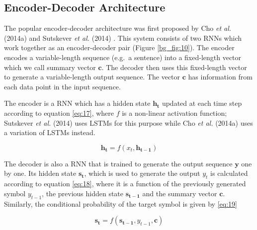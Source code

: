 \subsection{Encoder-Decoder Architecture} 
\label{bg:s4_sub1}

The popular encoder-decoder architecture was first proposed by Cho \textit{et al.} (2014a) \cite{cho2014learning} and Sutskever \textit{et al.} (2014) \cite{sutskever2014sequence}. This system consists of two \ac{RNN}s which work together as an encoder-decoder pair (Figure \ref{bg_fig:10}). The encoder encodes a variable-length sequence (e.g.\ a sentence) into a fixed-length vector which we call summary vector $ \mathbf{c} $. The decoder then uses this fixed-length vector to generate a variable-length output sequence. The vector $ \mathbf{c} $ has information from each data point in the input sequence.


The encoder is a \ac{RNN} which has a hidden state $\mathbf{h_t}$ updated at each time step according to equation \ref{eq:17}, where $f$ is a non-linear activation function;  Sutskever \textit{et al.} (2014) \cite{sutskever2014sequence} uses \ac{LSTM}s for this purpose while Cho \textit{et al.} (2014a) \cite{cho2014learning} uses a variation of \ac{LSTM}s instead.

\begin{equation}
\label{eq:17}
\mathbf{h_t} = f( x_t, \mathbf{h_{t-1}})
\end{equation}


The decoder is also a \ac{RNN} that is trained to generate the output sequence $ \mathbf{y}$ one by one. 
Its hidden state $ \mathbf{s_t}$, which is used to generate the output  $ y_t$ is calculated according to equation \ref{eq:18}, where it is a function of the previously generated symbol $y_{t-1}$, the previous hidden state $\mathbf{s_{t-1}}$ and the summary vector $\mathbf{c}$. Similarly, the conditional probability of the target symbol is given by \ref{eq:19}

\begin{equation}
\label{eq:18}
\mathbf{s_t} = f(\mathbf{s_{t-1}}, y_{t-1}, \mathbf{c})
\end{equation}

